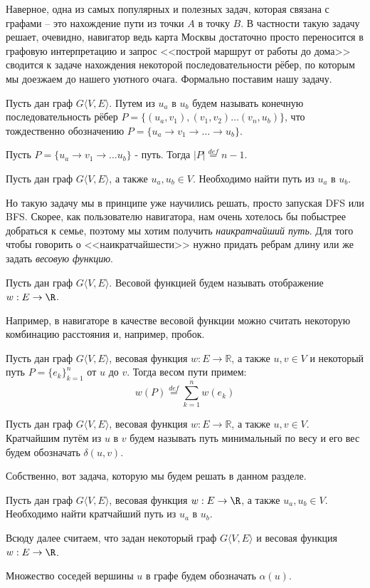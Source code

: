 Наверное, одна из самых популярных и полезных задач, которая связана с графами -- это нахождение пути из точки $A$ в точку $B$. В частности такую задачу решает, очевидно, навигатор ведь карта Москвы достаточно просто переносится в графовую интерпретацию и запрос <<построй маршрут от работы до дома>> сводится к задаче нахождения некоторой последовательности рёбер, по которым мы доезжаем до нашего уютного очага. Формально поставим нашу задачу.

\Def Пусть дан граф $G \langle V, E \rangle$. Путем из $u_a$ в $u_b$ будем называть конечную последовательность рёбер $P = \{(u_a, v_1), (v_1, v_2) \dots (v_n, u_b) \}$, что тождественно обозначению $P = \{ u_a \to v_1 \to \dots \to u_b \}$.

\Def Пусть $P = \{ u_a \to v_1 \to \dots u_b \}$ - путь. Тогда $|P| \overset{def}{=} n - 1$.

\Task Пусть дан граф $G \langle V, E \rangle$, а также $u_a, u_b \in V$. Необходимо найти путь из $u_a$ в $u_b$.

Но такую задачу мы в принципе уже научились решать, просто запуская DFS или BFS. Скорее, как пользователю навигатора, нам очень хотелось бы побыстрее добраться к семье, поэтому мы хотим получить \textit{наикратчайший путь}. Для того чтобы говорить о <<наикратчайшести>> нужно придать ребрам длину или же задать \textit{весовую функцию}.

\Def Пусть дан граф $G \langle V, E \rangle$. Весовой функцией будем называть отображение $w: E \to \R$.

Например, в навигаторе в качестве весовой функции можно считать некоторую комбинацию расстояния и, например, пробок.

\Def Пусть дан граф $G \langle V, E \rangle$, весовая функция $w: E \to \mathbb{R}$, а также $u, v \in V$ и некоторый путь $P = \{e_k\}_{k=1}^n$ от $u$ до $v$. Тогда весом пути примем: 
\begin{equation*}
    w(P) \overset{def}{=} \sum\limits_{k = 1}^n w(e_k)
\end{equation*}

\Def Пусть дан граф $G \langle V, E \rangle$, весовая функция $w: E \to \mathbb{R}$, а также $u, v \in V$. Кратчайшим путём из $u$ в $v$ будем называть путь минимальный по весу и его вес будем обозначать $\delta(u, v)$.

Собственно, вот задача, которую мы будем решать в данном разделе.

\Task Пусть дан граф $G \langle V, E \rangle$, весовая функция $w: E \to \R$, а также $u_a, u_b \in V$. Необходимо найти кратчайший путь из $u_a$ в $u_b$.

Всюду далее считаем, что задан некоторый граф $G\langle V, E \rangle$ и весовая функция $w: E \to \R$.

\Def Множество соседей вершины $u$ в графе будем обозначать $\alpha(u)$.
